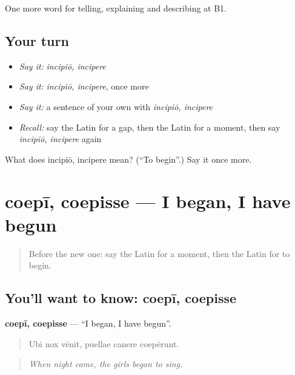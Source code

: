 \begin{grammarlens}[title={What you've built}]
One more word for telling, explaining and describing at B1.
\end{grammarlens}

\subsection*{Your turn}
\begin{itemize}
\raggedright
  \item \emph{Say it:} \emph{incipiō, incipere}
  \item \emph{Say it:} \emph{incipiō, incipere}, once more
  \item \emph{Say it:} a sentence of your own with \emph{incipiō, incipere}
  \item \emph{Recall:} say the Latin for a gap, then the Latin for a moment, then say \emph{incipiō, incipere} again
\end{itemize}

\begin{tcolorbox}[breakable,colback=teal!4,colframe=teal!35!black,title={Before you move on}]
What does incipiō, incipere mean? (\textquotedblleft{}To begin\textquotedblright{}.) Say it once more.
\end{tcolorbox}
\section[coepī, coepisse]{coepī, coepisse — I began, I have begun}

\label{lesson:LA-C297-coepi}



\begin{quote}
Before the new one: say the Latin for a moment, then the Latin for to begin.
\end{quote}

\subsection*{You'll want to know: coepī, coepisse}
\textbf{coepī, coepisse} — \textquotedblleft{}I began, I have begun\textquotedblright{}.

\begin{quote}
Ubi nox vēnit, puellae canere coepērunt.
\end{quote}

\begin{quote}
\emph{When night came, the girls began to sing.}
\end{quote}

